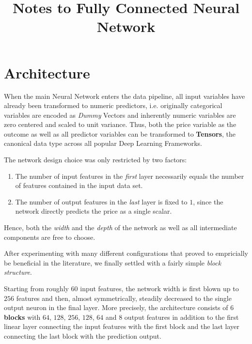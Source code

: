 \documentclass[12pt, letterpaper]{article}
\title{Notes to Fully Connected Neural Network}
\author{}
\date{}
\begin{document}
\maketitle
\tableofcontents
\setcounter{tocdepth}{3}

\section{Architecture}

When the main Neural Network enters the data pipeline, all input variables have already been transformed to numeric predictors, i.e. originally categorical variables are encoded as \emph{Dummy} Vectors and inherently numeric variables are zero centered and scaled to unit variance.
Thus, both the price variable as the outcome as well as all predictor variables can be transformed to \textbf{Tensors}, the canonical data type across all popular Deep Learning Frameworks.

The network design choice was only restricted by two factors:
\begin{enumerate}
    \item The number of input features in the \emph{first} layer necessarily equals the number of features contained in the input data set.
    \item The number of output features in the \emph{last} layer is fixed to $1$, since the network directly predicts the price as a single scalar.
\end{enumerate}
Hence, both the \emph{width} and the \emph{depth} of the network as well as all intermediate components are free to choose.

After experimenting with many different configurations that proved to empricially be beneficial in the literature, we finally settled with a fairly simple \emph{block structure}.

Starting from roughly $60$ input features, the network width is first blown up to $256$ features and then, almost symmetrically, steadily decreased to the single output neuron in the final layer.
More precisely, the architecture consists of $6$ \textbf{blocks} with $64$, $128$, $256$, $128$, $64$ and $8$ output features in addition to the first linear layer connecting the input features with the first block and the last layer connecting the last block with the prediction output.
\end{document}
